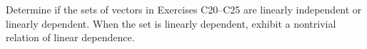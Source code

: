 Determine if the sets of vectors in Exercises C20--C25 are linearly independent or linearly dependent.  When the set is linearly dependent, exhibit a nontrivial relation of linear dependence.\\
%
%
%
